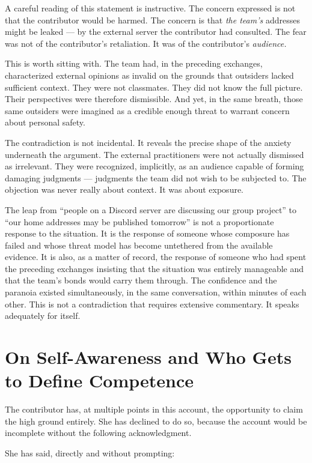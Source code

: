 \documentclass[11pt,a4paper]{book}
\begin{document}
A careful reading of this statement is instructive. The concern expressed is not that the contributor would be harmed. The concern is that \emph{the team's} addresses might be leaked --- by the external server the contributor had consulted. The fear was not of the contributor's retaliation. It was of the contributor's \emph{audience.}
 
This is worth sitting with. The team had, in the preceding exchanges, characterized external opinions as invalid on the grounds that outsiders lacked sufficient context. They were not classmates. They did not know the full picture. Their perspectives were therefore dismissible. And yet, in the same breath, those same outsiders were imagined as a credible enough threat to warrant concern about personal safety.
 
The contradiction is not incidental. It reveals the precise shape of the anxiety underneath the argument. The external practitioners were not actually dismissed as irrelevant. They were recognized, implicitly, as an audience capable of forming damaging judgments --- judgments the team did not wish to be subjected to. The objection was never really about context. It was about exposure.
 
The leap from ``people on a Discord server are discussing our group project'' to ``our home addresses may be published tomorrow'' is not a proportionate response to the situation. It is the response of someone whose composure has failed and whose threat model has become untethered from the available evidence. It is also, as a matter of record, the response of someone who had spent the preceding exchanges insisting that the situation was entirely manageable and that the team's bonds would carry them through. The confidence and the paranoia existed simultaneously, in the same conversation, within minutes of each other. This is not a contradiction that requires extensive commentary. It speaks adequately for itself.
 
\section{On Self-Awareness and Who Gets to Define Competence}
 
The contributor has, at multiple points in this account, the opportunity to claim the high ground entirely. She has declined to do so, because the account would be incomplete without the following acknowledgment.
 
She has said, directly and without prompting:
 
\end{document}
